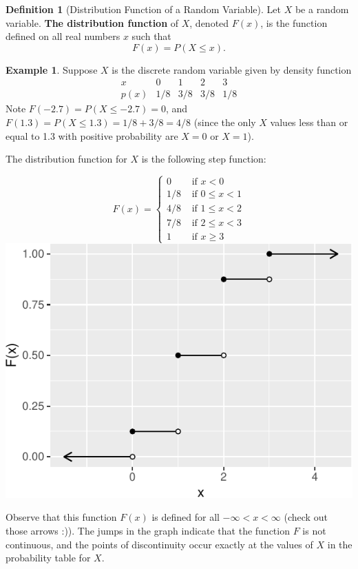 \documentclass[
]{book}
\theoremstyle{definition}
\newtheorem{definition}{Definition}[chapter]
\theoremstyle{definition}
\newtheorem{example}{Example}[chapter]
\theoremstyle{definition}
\theoremstyle{definition}
\theoremstyle{remark}
\begin{document}
\begin{definition}[Distribution Function of a Random Variable]
\protect\hypertarget{def:distribution-function}{}\label{def:distribution-function}Let \(X\) be a random variable. \textbf{The distribution function} of \(X\), denoted \(F(x)\), is the function defined on all real numbers \(x\) such that \[F(x) = P(X \leq x).\]
\end{definition}

\begin{example}
Suppose \(X\) is the discrete random variable given by density function
\[
\begin{array}{c|c|c|c|c}
x & 0 & 1 & 2 & 3 \\ \hline
p(x) & 1/8 & 3/8 & 3/8 & 1/8 
\end{array}
\]
Note \(F(-2.7) = P(X \leq -2.7) = 0\), and \(F(1.3) = P(X \leq 1.3) = 1/8 + 3/8 = 4/8\) (since the only \(X\) values less than or equal to 1.3 with positive probability are \(X=0\) or \(X=1\)).

The distribution function for \(X\) is the following step function:

\[
F(x)=
\begin{cases}
0 &\text{ if }x < 0 \\
1/8  &\text{ if } 0 \leq x < 1 \\
4/8 &\text{ if } 1 \leq x < 2 \\
7/8 &\text{ if } 2 \leq x < 3 \\
1 &\text{ if } x \geq 3
\end{cases}
\]
\includegraphics{math340-notes_files/figure-latex/unnamed-chunk-14-1.pdf}

Observe that this function \(F(x)\) is defined for all \(-\infty < x < \infty\) (check out those arrows :)). The jumps in the graph indicate that the function \(F\) is not continuous, and the points of discontinuity occur exactly at the values of \(X\) in the probability table for \(X\).
\end{example}
\end{document}
